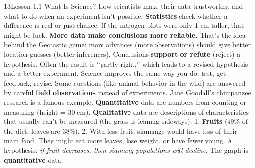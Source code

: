\documentclass[11pt,letterpaper]{article}
\begin{document}
\begin{tbpage}{13}{Lesson 1.1 What Is Science?}
  {How scientists make their data trustworthy, and what to do when an experiment isn't possible.}
    {\textbf{Statistics} check whether a difference is real or just chance. If the nitrogen plots were only 1 cm taller, that might be luck.}
    {\textbf{More data make conclusions more reliable.} That's the idea behind the Geotastic game: more advances (more observations) should give better location guesses (better inferences).}
    {Conclusions \textbf{support or refute} (reject) a hypothesis. Often the result is ``partly right,'' which leads to a revised hypothesis and a better experiment. Science improves the same way you do: test, get feedback, revise.}
    {Some questions (like animal behavior in the wild) are answered by careful \textbf{field observations} instead of experiments. Jane Goodall's chimpanzee research is a famous example.}
    {\textbf{Quantitative} data are numbers from counting or measuring (height = 30 cm). \textbf{Qualitative} data are descriptions of characteristics that usually can't be measured (the grass is leaning sideways).}
    {1. \textbf{Fruits} (49\% of the diet; leaves are 38\%). 2. With less fruit, siamangs would have less of their main food. They might eat more leaves, lose weight, or have fewer young. A hypothesis: \emph{if fruit decreases, then siamang populations will decline.} The graph is \textbf{quantitative} data.}
\end{tbpage}
\end{document}
